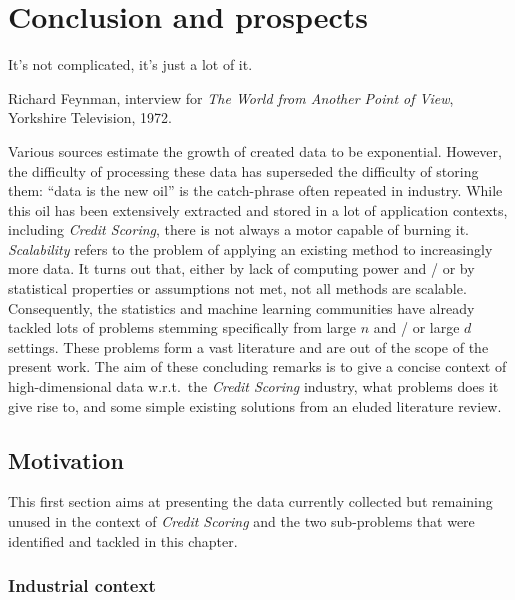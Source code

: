 \chapter*{Conclusion and prospects} \label{ccl}


\epigraph{It's not complicated, it's just a lot of it.}{Richard Feynman, interview for \textit{The World from Another Point of View}, Yorkshire Television, 1972.}

\minitoc

Various sources estimate the growth of created data to be exponential. However, the difficulty of processing these data has superseded the difficulty of storing them: ``data is the new oil'' is the catch-phrase often repeated in industry. While this oil has been extensively extracted and stored in a lot of application contexts, including \textit{Credit Scoring}, there is not always a motor capable of burning it. \textit{Scalability} refers to the problem of applying an existing method to increasingly more data. It turns out that, either by lack of computing power and / or by statistical properties or assumptions not met, not all methods are scalable.
Consequently, the statistics and machine learning communities have already tackled lots of problems stemming specifically from large $n$ and / or large $d$ settings.
These problems form a vast literature and are out of the scope of the present work.
The aim of these concluding remarks is to give a concise context of high-dimensional data w.r.t.\ the \textit{Credit Scoring} industry, what problems does it give rise to, and some simple existing solutions from an eluded literature review.

\section{Motivation}

This first section aims at presenting the data currently collected but remaining unused in the context of \textit{Credit Scoring} and the two sub-problems that were identified and tackled in this chapter.

\subsection{Industrial context}

